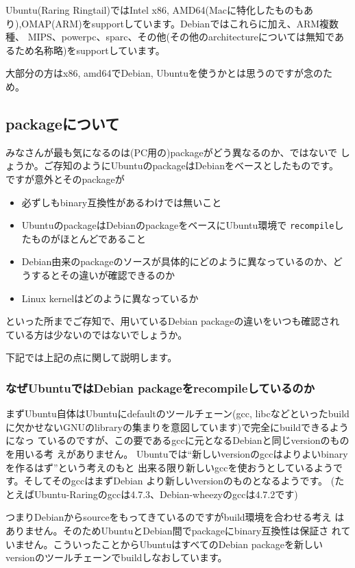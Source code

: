 \documentclass[mingoth,a4paper]{jsarticle}
\begin{document}
Ubuntu(Raring Ringtail)ではIntel x86, AMD64(Macに特化したものもあ
り),OMAP(ARM)をsupportしています。Debianではこれらに加え、ARM複数種、
MIPS、powerpc、sparc、その他(その他のarchitectureについては無知であ
るため名称略)をsupportしています。

大部分の方はx86, amd64でDebian, Ubuntuを使うかとは思うのですが念のため。

\subsection{packageについて}

みなさんが最も気になるのは(PC用の)packageがどう異なるのか、ではないで
しょうか。ご存知のようにUbuntuのpackageはDebianをベースとしたものです。
ですが意外とそのpackageが

\begin{itemize}
\itemsep1pt\parskip0pt
\item
  必ずしもbinary互換性があるわけでは無いこと
\item
  UbuntuのpackageはDebianのpackageをベースにUbuntu環境で
  \texttt{recompile}したものがほとんどであること
\item
  Debian由来のpackageのソースが具体的にどのように異なっているのか、ど
  うするとその違いが確認できるのか
\item
  Linux kernelはどのように異なっているか
\end{itemize}

といった所までご存知で、用いているDebian packageの違いをいつも確認され
ている方は少ないのではないでしょうか。

下記では上記の点に関して説明します。

\subsubsection{なぜUbuntuではDebian packageをrecompileしているのか}

まずUbuntu自体はUbuntuにdefaultのツールチェーン(gcc,
libcなどといったbuild
に欠かせないGNUのlibraryの集まりを意図しています)で完全にbuildできるようになっ
ているのですが、この要であるgccに元となるDebianと同じversionのものを用いる考
えがありません。
Ubuntuでは``新しいversionのgccはよりよいbinaryを作るはず''という考えのもと
出来る限り新しいgccを使おうとしているようです。そしてそのgccはまずDebian
より新しいversionのものとなるようです。
(たとえばUbuntu-Raringのgccは4.7.3、Debian-wheezyのgccは4.7.2です)

つまりDebianからsourceをもってきているのですがbuild環境を合わせる考え
はありません。そのためUbuntuとDebian間でpackageにbinary互換性は保証さ
れていません。こういったことからUbuntuはすべてのDebian packageを新しい
versionのツールチェーンでbuildしなおしています。
\end{document}
